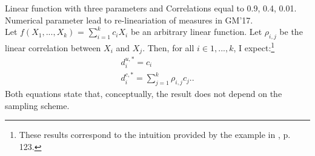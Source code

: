 \documentclass[a4paper,12pt]{article}
\begin{document}
Linear function with three parameters and Correlations equal to 0.9, 0.4, 0.01.
Numerical parameter lead to re-lineariation of measures in GM'17.\\


Let $f(X_1, ..., X_k)$ = $\sum_{i = 1}^{k} c_i X_i$ be an arbitrary linear function. Let $\rho_{i,j}$ be the linear correlation between $X_i$ and $X_j$. Then, for all $i \in 1, ..., k$, I expect:\footnote{These results correspond to the intuition provided by the example in \cite{Saltelli.2008}, p. 123.}
\begin{align}
d_i^{u,*} = c_i \label{eq:diu}\\
d_i^{c,*} = \sum_{j = 1}^{k} \rho_{i,j} c_{j}. \label{eq:dic}.
\end{align}
Both equations state that, conceptually, the result does not depend on the sampling scheme.
\newpage
\end{document}
